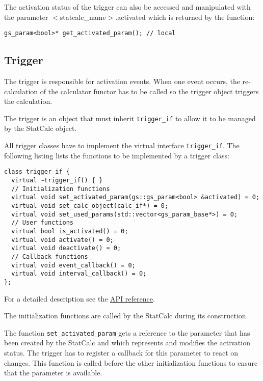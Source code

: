 The activation status of the trigger can also be accessed and manipulated with the parameter \mbox{\sffamily $<$statcalc\_name$>$.activated} which is returned by the function:
\begin{lstlisting}
gs_param<bool>* get_activated_param(); // local
\end{lstlisting}



\subsection{Trigger}
\label{GAVTrigger}

The trigger is responsible for activation events. When one event occurs, the re-calculation of the calculator functor has to be called so the trigger object triggers the calculation. 

The trigger is an object that must inherit \lstinline|trigger_if| to allow it to be managed by the StatCalc object.

All trigger classes have to implement the virtual interface \mbox{\lstinline|trigger_if|.} The following listing lists the functions to be implemented by a trigger class:

\noindent
\begin{minipage}{\textwidth}
\begin{lstlisting}[caption={Trigger interface trigger\_if}]
class trigger_if {
  virtual ~trigger_if() { }
  // Initialization functions
  virtual void set_activated_param(gs::gs_param<bool> &activated) = 0;
  virtual void set_calc_object(calc_if*) = 0;
  virtual void set_used_params(std::vector<gs_param_base*>) = 0;
  // User functions
  virtual bool is_activated() = 0;
  virtual void activate() = 0;
  virtual void deactivate() = 0;
  // Callback functions
  virtual void event_callback() = 0;
  virtual void interval_callback() = 0;
};
\end{lstlisting}
\end{minipage}

For a detailed description see the \hyperlink{GAVDoxygenRef08target}{API reference}.

The initialization functions are called by the StatCalc during its construction.

The function \lstinline|set_activated_param| gets a reference to the parameter that has been created by the StatCalc and which represents and modifies the activation status. The trigger has to register a callback for this parameter to react on changes. This function is called before the other initialization functions to ensure that the parameter is available.

